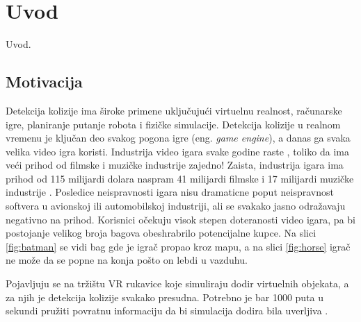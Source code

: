 \documentclass[12pt,oneside]{memoir}
\begin{document}
\frontmatter

\naslovna
\komisija
\apstrakt
\tableofcontents*

\mainmatter

\chapter{Uvod}
\label{sec:uvod}

Uvod.

\section{Motivacija}
\label{sec:naslov1}
Detekcija kolizije ima široke primene uključujući virtuelnu realnost, računarske igre, planiranje putanje robota i
fizičke simulacije.
Detekcija kolizije u realnom vremenu je ključan deo svakog pogona igre (eng. {\em game engine}), a danas ga svaka velika
video igra koristi. Industrija video igara svake godine raste \cite{game_industry},
toliko da ima veći prihod od filmske i muzičke industrije zajedno! Zaista, industrija igara ima prihod od
115 milijardi dolara naspram 41 milijardi filmske i 17 milijardi muzičke industrije \cite{music} \cite{movie} \cite{game_industry}.
Posledice neispravnosti igara nisu dramaticne poput neispravnost softvera u avionskoj ili automobilskoj industriji, ali 
se svakako jasno odražavaju negativno na prihod.
Korisnici očekuju visok stepen doteranosti video igara, pa bi postojanje velikog broja bagova 
 obeshrabrilo potencijalne kupce. Na slici \ref{fig:batman} se vidi bag gde je igrač propao kroz 
 mapu, a na slici \ref{fig:horse} igrač ne može da se popne na konja pošto on lebdi u vazduhu.

Pojavljuju se na tržištu VR rukavice koje simuliraju dodir virtuelnih objekata, a za njih je 
detekcija kolizije svakako presudna. Potrebno je bar 1000 puta u sekundi pružiti povratnu informaciju
da bi simulacija dodira bila uverljiva \cite{haptic}. 
\end{document}
